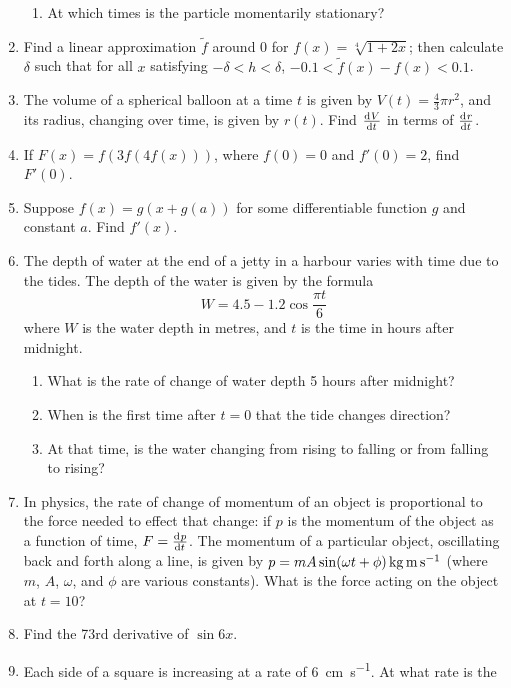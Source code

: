 \begin{enumerate}
\begin{enumerate}
      \item At which times is the particle momentarily stationary?
    \end{enumerate}
  \item Find a linear approximation $ \tilde f $ around 0 for $ f(x) = \sqrt[4]{1 + 2x} $; then calculate $ \delta $ such that
        for all $ x $ satisfying $ -\delta < h < \delta $, $ -0.1 < \tilde f(x) - f(x) < 0.1 $.
  \item The volume of a spherical balloon at a time $ t $ is given by $ V(t) = \frac{4}{3} \pi r^2 $, and its radius, changing
        over time, is given by $ r(t) $. Find $ \od{V}{t} $ in terms of $ \od{r}{t} $.
  \item If $ F(x) = f(3f(4f(x))) $, where $ f(0) = 0 $ and $ f'(0) = 2 $, find $ F'(0) $.
  \item Suppose $ f(x) = g(x + g(a)) $ for some differentiable function $ g $ and constant $ a $. Find $ f'(x) $.
  \item The depth of water at the end of a jetty in a harbour varies with time due to the tides. The depth
        of the water is given by the formula
        \begin{displaymath}
          W = 4.5 - 1.2 \cos \frac{\pi t}{6}
        \end{displaymath}
        where $ W $ is the water depth in metres, and $ t $ is the time in hours after midnight.
    \begin{enumerate}
      \item What is the rate of change of water depth 5 hours after midnight?
      \item When is the first time after $ t = 0 $ that the tide changes direction?
      \item At that time, is the water changing from rising to falling or from falling to rising?
    \end{enumerate}
  \item In physics, the rate of change of momentum of an object is proportional to the force needed to effect
        that change: if $ p $ is the momentum of the object as a function of time, $ F = \od{p}{t} $. The momentum
        of a particular object, oscillating back and forth along a line, is given by $ p = mA\sin(\omega t + \phi)\thinspace\si{\kilo\gram\metre\per\second} $
        (where $ m $, $ A $, $ \omega $, and $ \phi $ are various constants). What is the force acting on the object at $ t = 10 $?
  \item Find the 73rd derivative of $ \sin 6x $.
  \item Each side of a square is increasing at a rate of \SI{6}{\centi\metre\per\second}. At what rate is the

\end{enumerate}

